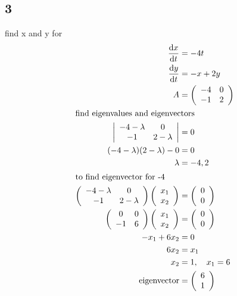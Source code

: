 \documentclass{article}
\begin{document}
\subsection*{3}
find x and y for
\begin{align*}
  \frac{\mathrm{d}x}{\mathrm{d}t}&=-4t\\
  \frac{\mathrm{d}y}{\mathrm{d}t}&=-x+2y\\
  A&=\left(\begin{array}{cc}-4&0\\-1&2\end{array}\right)\\
  \intertext{find eigenvalues and eigenvectors}
  \left\lvert\begin{array}{cc}-4-\lambda&0\\-1&2-\lambda\end{array}\right\rvert&=0\\
  (-4-\lambda)(2-\lambda)-0&=0\\
  \lambda&=-4,2\\
  \intertext{to find eigenvector for -4}
  \left(\begin{array}{cc}-4-\lambda&0\\-1&2-\lambda\end{array}\right)\left(\begin{array}{c}x_1\\x_2\end{array}\right)&=\left(\begin{array}{c}0\\0\end{array}\right)\\
  \left(\begin{array}{cc}0&0\\-1&6\end{array}\right)\left(\begin{array}{c}x_1\\x_2\end{array}\right)&=\left(\begin{array}{c}0\\0\end{array}\right)\\
  -x_1+6x_2&=0\\
  6x_2&=x_1\\
  x_2&=1,\quad x_1=6\\
  \text{eigenvector}&=\left(\begin{array}{c}6\\1\end{array}\right)\\

\end{align*}
\end{document}
